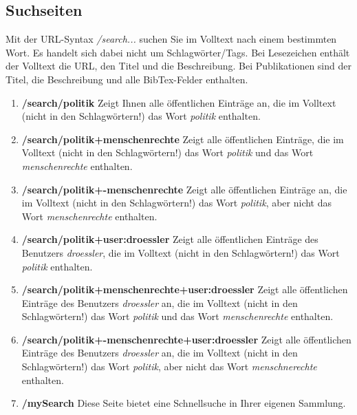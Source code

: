 \subsection{Suchseiten}
\label{subsec:suchseiten}
Mit der URL-Syntax \textit{/search...} suchen Sie im Volltext nach einem bestimmten Wort. Es handelt sich dabei nicht um Schlagwörter/Tags. Bei Lesezeichen enthält der Volltext die URL, den Titel und die Beschreibung. Bei Publikationen sind der Titel, die Beschreibung und alle BibTex-Felder enthalten.
\begin{enumerate}
    \item \textbf{/search/politik} \newline
    Zeigt Ihnen alle öffentlichen Einträge an, die im Volltext (nicht in den Schlagwörtern!) das Wort \textit{politik} enthalten. 
    \item \textbf{/search/politik+menschenrechte}\newline
    Zeigt alle öffentlichen Einträge, die im Volltext (nicht in den Schlagwörtern!) das Wort \textit{politik} und das Wort \textit{menschenrechte} enthalten. 
    \item \textbf{/search/politik+-menschenrechte} \newline
    Zeigt alle öffentlichen Einträge an, die im Volltext (nicht in den Schlagwörtern!) das Wort \textit{politik}, aber nicht das Wort \textit{menschenrechte} enthalten. 
    \item \textbf{/search/politik+user:droessler} \newline
    Zeigt alle öffentlichen Einträge des Benutzers \textit{droessler}, die im Volltext (nicht in den Schlagwörtern!) das Wort \textit{politik} enthalten. 
    \item \textbf{/search/politik+menschenrechte+user:droessler}\newline
    Zeigt alle öffentlichen Einträge des Benutzers \textit{droessler} an, die im Volltext (nicht in den Schlagwörtern!) das Wort \textit{politik} und das Wort \textit{menschenrechte} enthalten. 
    \item \textbf{/search/politik+-menschenrechte+user:droessler} \newline
    Zeigt alle öffentlichen Einträge des Benutzers \textit{droessler} an, die im Volltext (nicht in den Schlagwörtern!) das Wort \textit{politik}, aber nicht das Wort \textit{menschnerechte} enthalten. 
    \item \textbf{/mySearch} \newline
    Diese Seite bietet eine Schnellsuche in Ihrer eigenen Sammlung.
\end{enumerate}

